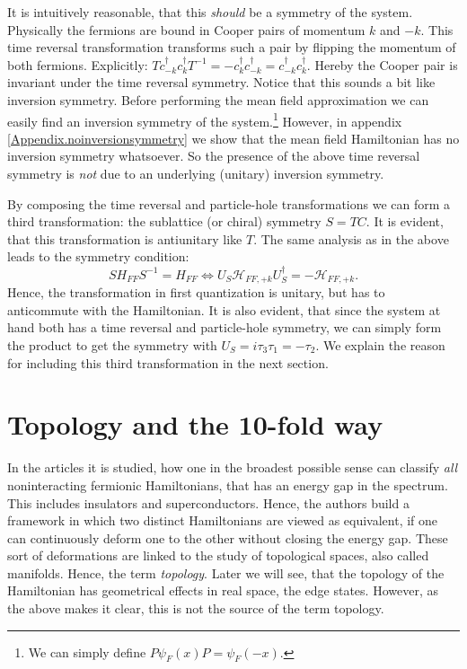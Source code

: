 It is intuitively reasonable, that this \textit{should} be a symmetry of the system. Physically the fermions are bound in Cooper pairs of momentum $k$ and $-k$. This time reversal transformation transforms such a pair by flipping the momentum of both fermions. Explicitly: $Tc^\dagger_{-k}c^\dagger_{k}T^{-1} = -c^\dagger_{k}c^\dagger_{-k} = c^\dagger_{-k}c^\dagger_{k}$. Hereby the Cooper pair is invariant under the time reversal symmetry. Notice that this sounds a bit like inversion symmetry. Before performing the mean field approximation we can easily find an inversion symmetry of the system.\footnote{We can simply define $P\psi_F(x)P = \psi_F(-x)$.} However, in appendix \ref{Appendix.noinversionsymmetry} we show that the mean field Hamiltonian has no inversion symmetry whatsoever. So the presence of the above time reversal symmetry is \textit{not} due to an underlying (unitary) inversion symmetry.

By composing the time reversal and particle-hole transformations we can form a third transformation: the sublattice (or chiral) symmetry $S = TC$. It is evident, that this transformation is antiunitary like $T$. The same analysis as in the above leads to the symmetry condition:
\begin{equation}
SH_{FF}S^{-1} = H_{FF} \Leftrightarrow U_S\mathcal{H}_{FF,+k} U^\dagger_S = - \mathcal{H}_{FF,+k}.
\end{equation}
Hence, the transformation in first quantization is unitary, but has to anticommute with the Hamiltonian. It is also evident, that since the system at hand both has a time reversal and particle-hole symmetry, we can simply form the product to get the symmetry with $U_S = i\tau_3\tau_1 = -\tau_2$. We explain the reason for including this third transformation in the next section. 

\section{Topology and the 10-fold way} \label{sec.Topology10foldway}
In the articles \cite{Ludwig.Topology, Chiu.Topology} it is studied, how one in the broadest possible sense can classify \textit{all} noninteracting fermionic Hamiltonians, that has an energy gap in the spectrum. This includes insulators and superconductors. Hence, the authors build a framework in which two distinct Hamiltonians are viewed as equivalent, if one can continuously deform one to the other without closing the energy gap. These sort of deformations are linked to the study of topological spaces, also called manifolds. Hence, the term \textit{topology}. Later we will see, that the topology of the Hamiltonian has geometrical effects in real space, the edge states. However, as the above makes it clear, this is not the source of the term topology.  

